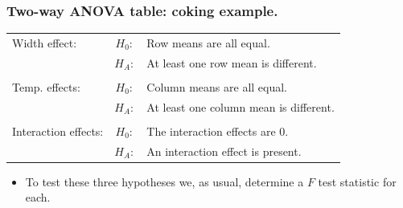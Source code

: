 \documentclass[12pt,xcolor=dvipsnames,handout,mathserif,aspectratio=169]{beamer}
\begin{document}
\begin{frame}
\frametitle{Two-way ANOVA table: coking example.}
\begin{center}
		\begin{tabular}{lcl}
		Width effect: & $H_0:$ & Row means are all equal.\\
		                       & $H_A:$ & At least one row mean is different.\\
		                        & & \\
		Temp. effects: & $H_0:$ & Column means are all equal.\\
		                       & $H_A:$ & At least one column mean is different.\\
		                       & & \\
		Interaction effects: & $H_0:$ & The interaction effects are 0.\\
		                       & $H_A:$ & An interaction effect is present.\\
		\end{tabular}
		\end{center}
\begin{itemize}
\item To test these three hypotheses we, as usual, determine a $F$ test statistic for each.
\end{itemize}
\end{frame}
\end{document}
